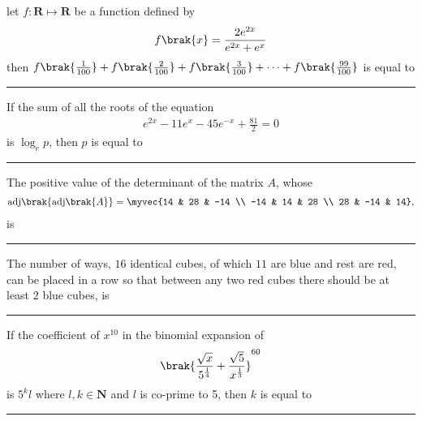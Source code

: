 \iffalse
\title{Assignment-2}
\author{EE24BTECH11049}
\section{integer}
\fi

%

    \item 
    let $f: \mathbf{R} \mapsto \mathbf{R}$ be a function defined by 
    \begin{align*}
        f\brak{x} = \frac{2e^{2x}}{e^{2x} + e^{x}}
    \end{align*}
    then $f\brak{\frac{1}{100}} + f\brak{\frac{2}{100}} + f\brak{\frac{3}{100}} + \dots + f\brak{\frac{99}{100}}$ is equal to \rule{1cm}{0.1pt}

    \hfill{}

    \item
    If the sum of all the roots of the equation 
    \begin{align*}
        e^{2x} - 11e^x - 45e^{-x} +\frac{81}{2}=0
    \end{align*}
    is $\log_e p$, then $p$ is equal to \rule{1cm}{0.1pt}

    \hfill{}

    \item 
    The positive value of the determinant of the matrix $A$, whose
    \begin{align*}
        \text{adj}\brak{\text{adj}\brak{A}} = \myvec{14 & 28 & -14 \\ -14 & 14 & 28 \\ 28 & -14 & 14},
    \end{align*}
    is \rule{1cm}{0.1pt}

    \hfill{}

    \item 
    The number of ways, $16$ identical cubes, of which $11$ are blue and rest are red, can be placed in a row so that between any two red cubes there should be at least $2$ blue cubes, is \rule{1cm}{0.1pt}

    \hfill{}

    \item 
    If the coefficient of $x^{10}$ in the binomial expansion of 
    \begin{align*}
        \brak{\frac{\sqrt{x}}{5^{\frac{1}{4}}} + \frac{\sqrt{5}}{x^{\frac{1}{3}}}}^{60}
    \end{align*}
    is $5^kl$ where $l,k \in \mathbf{N}$ and $l$ is co-prime to 5, then $k$ is equal to \rule{1cm}{0.1pt}

